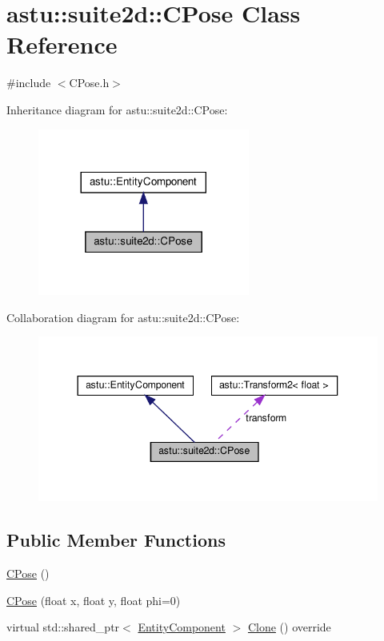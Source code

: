 \hypertarget{classastu_1_1suite2d_1_1CPose}{}\section{astu\+:\+:suite2d\+:\+:C\+Pose Class Reference}
\label{classastu_1_1suite2d_1_1CPose}


{\ttfamily \#include $<$C\+Pose.\+h$>$}



Inheritance diagram for astu\+:\+:suite2d\+:\+:C\+Pose\+:\nopagebreak
\begin{figure}[H]
\begin{center}
\leavevmode
\includegraphics[width=197pt]{classastu_1_1suite2d_1_1CPose__inherit__graph}
\end{center}
\end{figure}


Collaboration diagram for astu\+:\+:suite2d\+:\+:C\+Pose\+:\nopagebreak
\begin{figure}[H]
\begin{center}
\leavevmode
\includegraphics[width=344pt]{classastu_1_1suite2d_1_1CPose__coll__graph}
\end{center}
\end{figure}
\subsection*{Public Member Functions}
\begin{DoxyCompactItemize}
\item 
\hyperlink{classastu_1_1suite2d_1_1CPose_ae43f407c724a21294a886ae9fc0a4d60}{C\+Pose} ()
\item 
\hyperlink{classastu_1_1suite2d_1_1CPose_a84da6beb4c3f58a90eee567a649cabf4}{C\+Pose} (float x, float y, float phi=0)
\item 
virtual std\+::shared\+\_\+ptr$<$ \hyperlink{classastu_1_1EntityComponent}{Entity\+Component} $>$ \hyperlink{classastu_1_1suite2d_1_1CPose_a90d4fb820221ddabf9c95d5a10796359}{Clone} () override
\end{DoxyCompactItemize}
